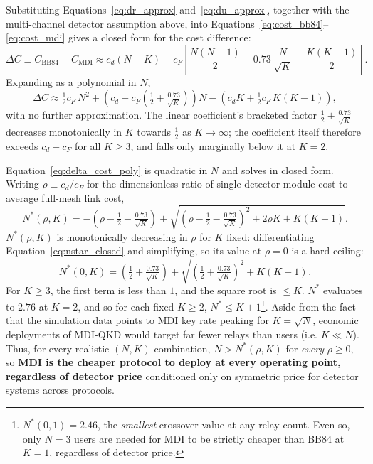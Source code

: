 \documentclass[12pt]{article}
\begin{document}
Substituting Equations~\ref{eq:dr_approx} and~\ref{eq:du_approx}, together with the multi-channel detector assumption above, into Equations~\ref{eq:cost_bb84}--\ref{eq:cost_mdi} gives a closed form for the cost difference:
\begin{equation}
    \Delta C \equiv C_\text{BB84} - C_\text{MDI} \approx c_d(N-K) + c_F\left[\frac{N(N-1)}{2} - 0.73\,\frac{N}{\sqrt K} - \frac{K(K-1)}{2}\right].
    \label{eq:delta_cost}
\end{equation}
Expanding as a polynomial in $N$,
\begin{equation}
    \Delta C \approx \tfrac{1}{2}c_F\,N^2 + \left(c_d - c_F\left(\tfrac{1}{2}+\tfrac{0.73}{\sqrt{K}}\right)\right)N - \left(c_dK + \tfrac{1}{2}c_F\,K(K-1)\right),
    \label{eq:delta_cost_poly}
\end{equation}
with no further approximation. The linear coefficient's bracketed factor $\tfrac{1}{2}+\tfrac{0.73}{\sqrt{K}}$ decreases monotonically in $K$ towards $\tfrac12$ as $K\to\infty$; the coefficient itself therefore exceeds $c_d - c_F$ for all $K\geq3$, and falls only marginally below it at $K=2$.

Equation~\ref{eq:delta_cost_poly} is quadratic in $N$ and solves in closed form. Writing $\rho \equiv c_d/c_F$ for the dimensionless ratio of single detector-module cost to average full-mesh link cost,
\begin{equation}
    N^*(\rho,K) = -\left(\rho-\tfrac12-\tfrac{0.73}{\sqrt K}\right) + \sqrt{\left(\rho-\tfrac12-\tfrac{0.73}{\sqrt K}\right)^{2} + 2\rho K + K(K-1)}.
    \label{eq:nstar_closed}
\end{equation}
$N^*(\rho,K)$ is monotonically decreasing in $\rho$ for $K$ fixed: differentiating Equation~\ref{eq:nstar_closed} and simplifying, so its value at $\rho=0$ is a hard ceiling:
\begin{equation}
    N^*(0,K) = \left(\tfrac12+\tfrac{0.73}{\sqrt K}\right) + \sqrt{\left(\tfrac12+\tfrac{0.73}{\sqrt K}\right)^{2}+K(K-1)}.
\end{equation}
For $K\geq3$, the first term is less than $1$, and the square root is $\leq K$. $N^*$ evaluates to $2.76$ at $K=2$, and so for each fixed $K\geq2$, $N^*\leq K+1$\footnote{$N^*(0,1)=2.46$, the \emph{smallest} crossover value at any relay count. Even so, only $N=3$ users are needed for MDI to be strictly cheaper than BB84 at $K=1$, regardless of detector price.}. Aside from the fact that the simulation data points to MDI key rate peaking for $K=\sqrt{N}$, economic deployments of MDI-QKD would target far fewer relays than users (i.e. $K\ll N$). Thus, for every realistic $(N,K)$ combination, $N>N^*(\rho,K)$ for \emph{every} $\rho\geq0$, so \textbf{MDI is the cheaper protocol to deploy at every operating point, regardless of detector price} conditioned only on symmetric price for detector systems across protocols.
\end{document}
